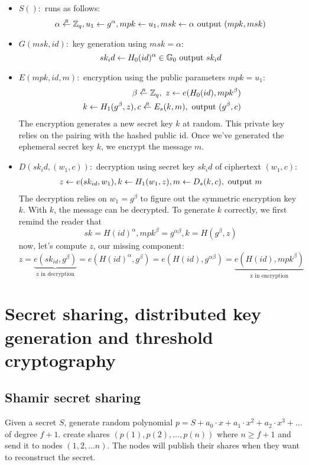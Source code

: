 \begin{itemize}
  \item $S():$ runs as follows:
  $$ \alpha\overset{_R}{\leftarrow} \mathbb{Z}_q, u_1\leftarrow g^\alpha, mpk \leftarrow u_1, msk \leftarrow \alpha 
  \text{ output }(mpk,msk) $$
  \item $G(msk,id):$ key generation using $msk = \alpha$:
  $$ sk_id \leftarrow H_0(id)^\alpha \in \mathbb{G}_0 \text{ output } sk_id$$
  \item $E(mpk, id, m ):$ encryption using the public parameters $mpk=u_1$:
  \begin{align*}\label{lamlam} 
    \beta \getrandom \Z_q,\  z\from e(H_0(id),mpk^\beta) 
    \\ \ 
    k\from H_1(g^\beta,z), c\getrandom E_s(k,m), \text{ output } (g^\beta,c)
  \end{align*}
  The encryption generates a new secret key $k$ at random. This private key relies on the pairing with
  the hashed public id. Once we've generated the ephemeral secret key $k$, we encrypt the message $m$.

  \item $D(sk_id,(w_1,c)):$ decryption using secret key $sk_id$ of ciphertext $(w_1,c)$:
  \begin{align*}
    z \leftarrow  e(sk_{id},w_1), k\leftarrow H_1(w_1, z), m\leftarrow D_s(k,c),
  \text{ output } m
  \end{align*}
  The decryption relies on $w_1=g^\beta$ to figure out the symmetric encryption key $k$.
  With $k$, the message can be decrypted.
  \newline
  To generate $k$ correctly, we first remind the reader that $$sk=H(id)^\alpha, mpk^\beta=g^{\alpha\beta}, k=H(g^\beta,z)$$
  now, let's compute $z$, our missing component:
  $$
  z=\underbrace{e(sk_{id},g^\beta)}_{\text{z in decryption}}=e(H(id)^\alpha,g^\beta)=e(H(id),g^{\alpha\beta})=\underbrace{e(H(id),mpk^\beta)}_{\text{z in encryption}}
  $$
\end{itemize}




\chapter{Secret sharing, distributed key generation and threshold cryptography}
\section{Shamir secret sharing}
Given a secret $S$, generate random polynomial 
$p = S + a_0\cdot x + a_1\cdot x^2+a_2\cdot x^3+\dots$ of degree $f+1$.
create shares $(p(1),p(2),\dots, p(n))$ where $n\ge f+1$ and send it to nodes $(1,2,...n)$.
The nodes will publish their shares when they want to reconstruct the secret.


